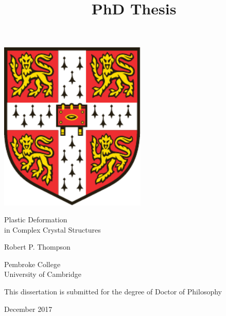 \documentclass[a4paper,12pt,twoside]{report}
\title{PhD Thesis}
\date{}
\begin{document}

\begin{titlepage}
\centering
\includegraphics[width = 7cm]{Figs/University_Crest}

\vspace{2cm}


{\huge Plastic Deformation\\}
\vspace{5mm}
{\huge in Complex Crystal Structures}

\vspace{2.5cm}

{\LARGE Robert P. Thompson} \\
\vspace{8mm}
{\large Pembroke College \\
University of Cambridge \\

\vspace{2.5cm}

This dissertation is submitted for the degree of Doctor of Philosophy \\
\vspace{3mm}

December 2017 \\}

\end{titlepage}







\setcounter{tocdepth}{1}
\end{document}
